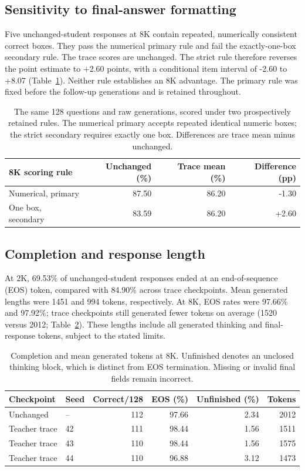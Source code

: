 \subsection{Sensitivity to final-answer formatting}
Five unchanged-student responses at 8K contain repeated, numerically consistent correct boxes. They pass the numerical primary rule and fail the exactly-one-box secondary rule. The trace scores are unchanged. The strict rule therefore reverses the point estimate to +2.60 points, with a conditional item interval of -2.60 to +8.07 (Table~\ref{tab:format-sensitivity}). Neither rule establishes an 8K advantage. The primary rule was fixed before the follow-up generations and is retained throughout.
\par\begin{table}[ht]\centering\small\begin{tabular}{lrrr}\toprule
8K scoring rule & Unchanged (\%) & Trace mean (\%) & Difference (pp) \\
\midrule
Numerical, primary & 87.50 & 86.20 & -1.30 \\
One box, secondary & 83.59 & 86.20 & +2.60 \\
\bottomrule\end{tabular}\caption{The same 128 questions and raw generations, scored under two prospectively retained rules. The numerical primary accepts repeated identical numeric boxes; the strict secondary requires exactly one box. Differences are trace mean minus unchanged.}\label{tab:format-sensitivity}\end{table}\par
\subsection{Completion and response length}
At 2K, 69.53\% of unchanged-student responses ended at an end-of-sequence (EOS) token, compared with 84.90\% across trace checkpoints. Mean generated lengths were 1451 and 994 tokens, respectively. At 8K, EOS rates were 97.66\% and 97.92\%; trace checkpoints still generated fewer tokens on average (1520 versus 2012; Table~\ref{tab:followup-completion}). These lengths include all generated thinking and final-response tokens, subject to the stated limits.
\par\begin{table}[ht]\centering\small\begin{tabular}{llrrrr}\toprule
Checkpoint & Seed & Correct/128 & EOS (\%) & Unfinished (\%) & Tokens \\
\midrule
Unchanged & -- & 112 & 97.66 & 2.34 & 2012 \\
Teacher trace & 42 & 111 & 98.44 & 1.56 & 1511 \\
Teacher trace & 43 & 110 & 98.44 & 1.56 & 1575 \\
Teacher trace & 44 & 110 & 96.88 & 3.12 & 1473 \\
\bottomrule\end{tabular}\caption{Completion and mean generated tokens at 8K. Unfinished denotes an unclosed thinking block, which is distinct from EOS termination. Missing or invalid final fields remain incorrect.}\label{tab:followup-completion}\end{table}\par
